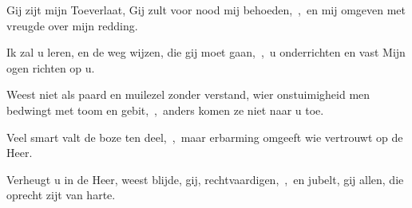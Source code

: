 \documentclass[12pt,twoside,a5paper]{article}
\begin{document}
\begin{halfparskip}
  Gij zijt mijn Toeverlaat, Gij zult voor nood mij behoeden,~\sep\ en mij omgeven met vreugde over mijn redding.

  Ik zal u leren, en de weg wijzen, die gij moet gaan,~\sep\ u onderrichten en vast Mijn ogen richten op u.

  Weest niet als paard en muilezel zonder verstand, wier onstuimigheid men bedwingt met toom en gebit,~\sep\ anders komen ze niet naar u toe.

  Veel smart valt de boze ten deel,~\sep\ maar erbarming omgeeft wie vertrouwt op de Heer.

  Verheugt u in de Heer, weest blijde, gij, rechtvaardigen,~\sep\ en jubelt, gij allen, die oprecht zijt van harte.
\end{halfparskip}

\end{document}
